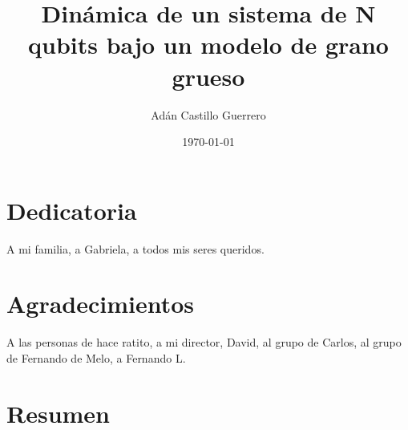 \documentclass[12pt,twoside]{book}
\title{Dinámica de un sistema de N qubits bajo un modelo de grano grueso}
\author{Adán Castillo Guerrero}
\date{\today}
\begin{document}



\section*{Dedicatoria}
A mi familia, a Gabriela, a todos mis seres queridos.

\cleardoublepage

\section*{Agradecimientos}
A las personas de hace ratito, a mi director, David, al grupo de Carlos, al grupo de Fernando de Melo, a Fernando L.

\cleardoublepage
\linenumbers
\setlength\linenumbersep{3pt}
\makeatletter
\let\LN@align\align
\let\LN@endalign\endalign
\renewcommand{\align}{\linenomath\LN@align}
\renewcommand{\endalign}{\LN@endalign\endlinenomath}
\let\LN@gather\gather
\let\LN@endgather\endgather
\renewcommand{\gather}{\linenomath\LN@gather}
\renewcommand{\endgather}{\LN@endgather\endlinenomath}
\makeatother

\section*{Resumen}
\end{document}
